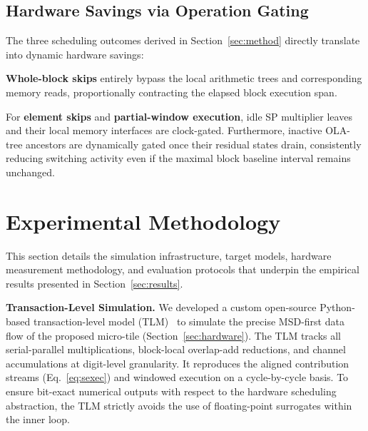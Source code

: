 \documentclass[sigconf]{acmart}
\begin{document}
\subsection{Hardware Savings via Operation Gating}
\label{sec:turnoff}
The three scheduling outcomes derived in Section~\ref{sec:method} directly translate into dynamic hardware savings:
\begin{itemize*}[nosep,leftmargin=1.2em]
    \item \textbf{Whole-block skips} entirely bypass the local arithmetic trees and corresponding memory reads, proportionally contracting the elapsed block execution span. 
    \item For \textbf{element skips} and \textbf{partial-window execution}, idle SP multiplier leaves and their local memory interfaces are clock-gated. Furthermore, inactive OLA-tree ancestors are dynamically gated once their residual states drain, consistently reducing switching activity even if the maximal block baseline interval remains unchanged.
\end{itemize*}

\section{Experimental Methodology}
\label{sec:setup}

This section details the simulation infrastructure, target models, hardware 
measurement methodology, and evaluation protocols that underpin the empirical 
results presented in Section~\ref{sec:results}.

\textbf{Transaction-Level Simulation.} We developed a custom open-source Python-based transaction-level model (TLM)~\cite{cai2003transaction,aguirre2024hardware} to simulate the 
precise MSD-first data flow of the proposed micro-tile 
(Section~\ref{sec:hardware}). The TLM tracks all serial-parallel 
multiplications, block-local overlap-add reductions, and channel accumulations 
at digit-level granularity. It reproduces the aligned contribution streams 
(Eq.~\ref{eq:sexec}) and windowed execution on a cycle-by-cycle basis. To 
ensure bit-exact numerical outputs with respect to the hardware scheduling 
abstraction, the TLM strictly avoids the use of floating-point surrogates 
within the inner loop.
\end{document}
